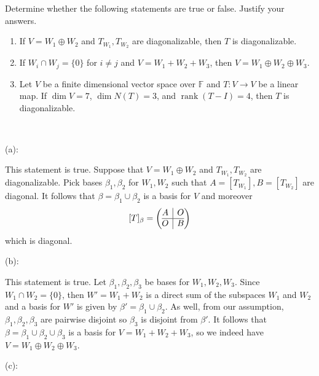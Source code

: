 \documentclass{eh-homework}
\begin{document}
    \begin{question}{11}
    Determine whether the following statements are true or false. Justify your answers.
    
    \begin{enumerate}[label=(\alph*)]
        \item If $V = W_1 \oplus W_2$ and $T_{W_1}, T_{W_2}$ are diagonalizable, then $T$ is diagonalizable.
        \item If $W_i \cap W_j = \{0\}$ for $i \neq j$ and $V = W_1 + W_2 + W_3$, then $V = W_1 \oplus W_2 \oplus W_3$.
        \item Let \(V\) be a finite dimensional vector space over \(\mathbb{F}\) and \(T: V \to V\) be a linear map. If $\dim V = 7$, $\dim N(T) = 3$, and $\operatorname{rank}(T - I) = 4$, then $T$ is diagonalizable.
    \end{enumerate}
    \tcblower
    \ 

    (a):

    This statement is true. Suppose that \(V = W_1 \oplus W_2\) and \(T_{W_1}, T_{W_2}\) are diagonalizable. Pick bases \(\beta _1, \beta _2\) for \(W_1, W_2\) such that \(A = [T_{W_1}], B = [T_{W_2}]\) are diagonal. It follows that \(\beta = \beta _1 \cup \beta _2\) is a basis for \(V\) and moreover
    \[
        [T]_\beta = \left( \begin{array}{@{}c|c@{}}
            A & O \\
            \hline
            O & B
        \end{array} \right)
    \]
    which is diagonal.

    \bigskip

    (b):

    This statement is true. Let \(\beta _1, \beta _2, \beta _3\) be bases for \(W_1, W_2, W_3\). Since \(W_1 \cap W_2 = \{ 0 \}\), then \(W' = W_1 + W_2\) is a direct sum of the subspaces \(W_1\) and \(W_2\) and a basis for \(W'\) is given by \(\beta ' = \beta _1 \cup \beta _2\). As well, from our assumption, \(\beta _1, \beta _2, \beta _3\) are pairwise disjoint so \(\beta_3\) is disjoint from \(\beta '\). It follows that \(\beta = \beta _1 \cup \beta _2 \cup \beta _3\) is a basis for \(V = W_1 + W_2 + W_3\), so we indeed have \(V = W_1 \oplus W_2 \oplus W_3\).

    \bigskip

    (c):

    
    \end{question}
\end{document}
